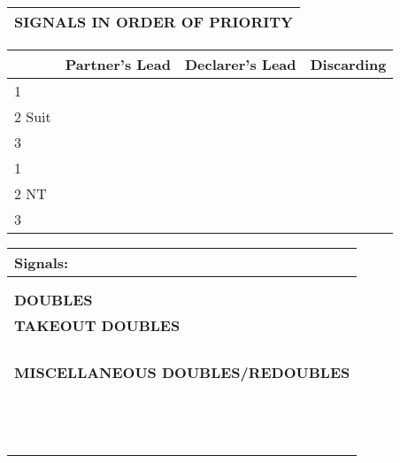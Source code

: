 \documentclass{article}
\begin{document}
\begin{minipage}{90mm}
\begin{tabular}{| p{88mm} |}
		\textbf{SIGNALS IN ORDER OF PRIORITY} \\ \hline
	\end{tabular}
	\begin{tabular}{| p{8.9mm} | p{22mm} | p{22mm} | p{22mm} |}
		& Partner's Lead & Declarer's Lead & Discarding \\ \hline
		1 & & & \\ \hline
		2 Suit & & & \\ \hline
		3 & & & \\ \hline
		1 & & & \\ \hline
		2 NT & & & \\ \hline
		3 & & & \\ \hline
	\end{tabular}
	\begin{tabular}{| p{88mm} |}
		Signals: \\ \hline
		\\ \hline
		\\ \hline \hline
		\cellcolor[gray]{0.9} \textbf{DOUBLES} \\ \hline
		\textbf{TAKEOUT DOUBLES} \\ \hline
		\\ \hline
		\\ \hline
		\\ \hline
		\\ \hline
		\textbf{MISCELLANEOUS DOUBLES/REDOUBLES} \\ \hline
		\\ \hline
		\\ \hline
		\\ \hline
		\\ \hline
		\\ \hline
		\\ \hline
		\\ \hline
		\\ \hline
		\\ \hline
		\\ \hline
		\\ \hline
		\\ \hline
		\\ \hline
	\end{tabular}
\end{minipage}
\begin{minipage}{5mm}
	\begin{tabular}{| p{5mm} |}
	\end{tabular}
\end{minipage}
\end{document}
